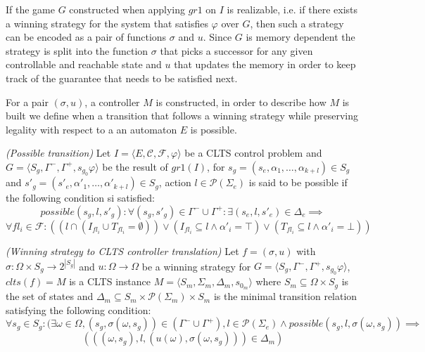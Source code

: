 If the game $G$ constructed when applying $gr1$ on $I$ is realizable, i.e. if there exists a winning strategy for the system that satisfies $\varphi$ over $G$, then such a strategy can be encoded as a pair of functions $\sigma
$ and $u$. Since $G$ is memory dependent the strategy is split into the function $\sigma$ that picks a successor for any given controllable and reachable state  and $u$ that updates the memory in order to keep track of the guarantee that needs to be satisfied next. 

For a pair $(\sigma,u)$, a controller $M$ is constructed, in order to describe how $M$ is built we define when a transition that follows a winning strategy while preserving legality with respect to a an automaton $E$ is possible.

\begin{definition}\label{def:strat_possible_transition} \emph{(Possible transition)} 
	Let $I = \langle E, \mathcal{C}, \mathcal{F}, \varphi \rangle$ be a CLTS control problem and $G = \langle S_g, \Gamma^-,\Gamma^+,s_{g_0}\varphi \rangle$ be the result of $gr1(I)$, for $s_g=(s_e,\alpha_1,\ldots,\alpha_{k+l}) \in S_g$ and $s'_g=(s'_e,\alpha'_1,\ldots,\alpha'_{k+l}) \in S_g$, action $l \in \mathcal{P}(\Sigma_e)$ is said to be possible if the following condition si satisfied:
	\[possible(s_g,l,s'_g):\forall (s_g,s'_g) \in \Gamma^- \cup \Gamma^+: \exists (s_e,l,s'_e) \in \Delta_e \implies \]
	\[ \forall fl_i \in \mathcal{F}: ((l \cap (I_{fl_i} \cup T_{fl_i} = \emptyset)) \vee (I_{fl_i} \subseteq l \wedge \alpha'_i = \top)\vee (T_{fl_i} \subseteq l \wedge \alpha'_i = \bot))\]
\end{definition}

\begin{definition}\label{def:strat_to_clts_translation} \emph{(Winning strategy to CLTS controller translation)} 
	Let $f=(\sigma,u)$ with $\sigma:\Omega \times S_g \rightarrow 2^{|S_g|}$ and
	$u:\Omega \rightarrow \Omega$ be a winning strategy for $G = \langle S_g, \Gamma^-,\Gamma^+,s_{g_0}\varphi \rangle$, $clts(f)=M$ is a CLTS instance $M=\langle S_m, \Sigma_m, \Delta_m, s_{0_m}\rangle$ where $S_m \subseteq \Omega \times S_g$ is the set of states
	and $\Delta_m \subseteq S_m \times \mathcal{P}(\Sigma_m) \times S_m$ is the minimal transition relation satisfying the following condition:
	\[\forall s_g \in S_g: (\exists \omega \in \Omega, (s_g,\sigma(\omega,s_g)) \in (\Gamma^- \cup \Gamma^+), l \in \mathcal{P}(\Sigma_e) \wedge possible(s_g,l,\sigma(\omega,s_g)) \implies \] \[(((\omega,s_g),l,(u(\omega),\sigma(\omega,s_g)))\in \Delta_m) \]
\end{definition}


